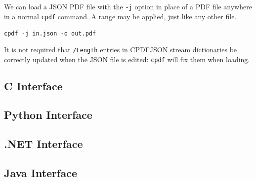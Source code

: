 \documentclass{book}
\begin{document}
We can load a JSON PDF file with the \texttt{-j} option in place of a PDF file anywhere in a normal \texttt{cpdf} command. A range may be applied, just like any other file. 

  \begin{framed}
  \small\noindent\verb!cpdf -j in.json -o out.pdf!
  \end{framed}

\noindent It is not required that \texttt{/Length} entries in CPDFJSON stream dictionaries be correctly updated when the JSON file is edited: \texttt{cpdf} will fix them when loading.

\begin{cpdflib}
\clearpage
\section*{C Interface}
\begin{small}\tt

\end{small}
\end{cpdflib}

\begin{pycpdflib}
\clearpage
\section*{Python Interface}
\begin{small}\tt

\end{small}
\end{pycpdflib}

\begin{dotnetcpdflib}
\clearpage
\section*{.NET Interface}
\begin{small}\tt

\end{small}
\end{dotnetcpdflib}

\begin{jcpdflib}
\clearpage
\section*{Java Interface}
\begin{small}\tt

\end{small}
\end{jcpdflib}
\end{document}
